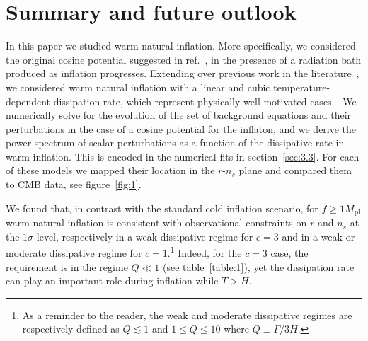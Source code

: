 \documentclass[a4paper,11pt]{article}
\begin{document}
\section{Summary and future outlook \label{sec:5}}

In this paper we studied warm natural inflation. More specifically, we considered the original cosine potential suggested in ref.~\cite{Freese:1990rb}, in the presence of a radiation bath produced as inflation progresses. Extending over previous work in the literature~\cite{Visinelli:2011jy, Reyimuaji:2020bkm, Correa:2022ngq}, we considered warm natural inflation with a linear and cubic temperature-dependent dissipation rate, which represent physically well-motivated cases~\cite{Berghaus:2019whh, Berghaus:2020ekh, DeRocco:2021rzv}. We numerically solve for the evolution of the set of background equations and their perturbations in the case of a cosine potential for the inflaton, and we derive the power spectrum of scalar perturbations as a function of the dissipative rate in warm inflation. This is encoded in the numerical fits in section~\ref{sec:3.3}. For each of these models we mapped their location in the $r$-$n_s$ plane and compared them to CMB data, see figure~\ref{fig:1}.

We found that, in contrast with the standard cold inflation scenario, for $f\geq 1 M_\mathrm{pl}$ warm natural inflation is consistent with observational constraints on $r$ and $n_s$ at the $1\sigma$ level, respectively in a weak dissipative regime for $c=3$ and in a weak or moderate dissipative regime for $c=1$.\footnote{As a reminder to the reader, the weak and moderate dissipative regimes are respectively defined as $Q\lesssim1$ and $1\leq Q\leq 10$ where $Q \equiv \Gamma/3H$.} Indeed, for the $c=3$ case, the requirement is in the regime $Q\ll 1$ (see table~\ref{table:1}), yet the dissipation rate can play an important role during inflation while $T>H$. 
\end{document}
